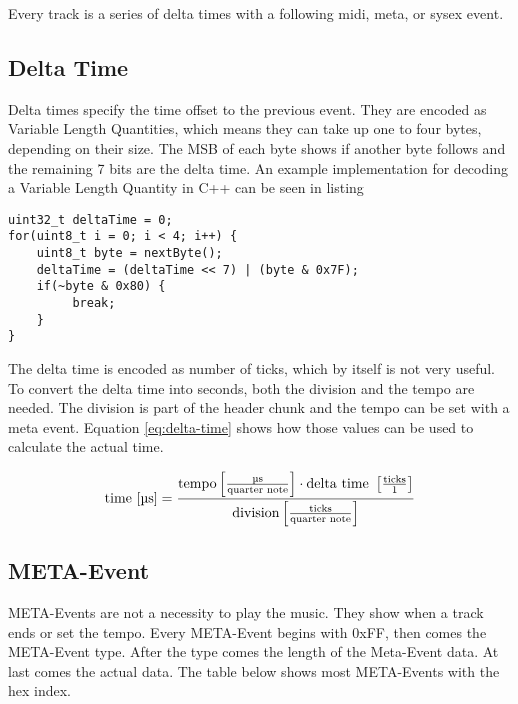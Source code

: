 Every track is a series of delta times with a following \gls{midi}, meta, or sysex event.

\subsection{Delta Time}

Delta times specify the time offset to the previous event. They are encoded as Variable Length Quantities, which means they can take up one to four bytes, depending on their size. The MSB %
of each byte shows if another byte follows and the remaining 7 bits are the delta time. An example implementation for decoding a Variable Length Quantity in C++ can be seen in listing

\begin{lstlisting}
uint32_t deltaTime = 0;
for(uint8_t i = 0; i < 4; i++) {
    uint8_t byte = nextByte();
    deltaTime = (deltaTime << 7) | (byte & 0x7F);
    if(~byte & 0x80) {
         break;
    }
}
\end{lstlisting}

The delta time is encoded as number of ticks, which by itself is not very useful. To convert the delta time into seconds, both the division and the tempo are needed. The division is part of the header chunk and the tempo can be set with a meta event. Equation \ref{eq:delta-time} shows how those values can be used to calculate the actual time.

\begin{equation}\label{eq:delta-time}
    \textnormal{time [\textmu s]} = \frac{{\textnormal{tempo} \left[ \frac{\textnormal{\textmu s}}{\textnormal{quarter note}} \right] \cdot \textnormal{delta time } \left[\frac{\textnormal{ticks}}{1}\right]}}{\textnormal{division}  \left[ \frac{\textnormal{ticks}}{\textnormal{quarter note}} \right]}
\end{equation}

\subsection{META-Event}

META-Events are not a necessity to play the music. They show when a track ends or set the tempo. Every META-Event begins with 0xFF, then comes the META-Event type. After the type comes the length of the Meta-Event data. At last comes the actual data. The table below shows most META-Events with the hex index.

